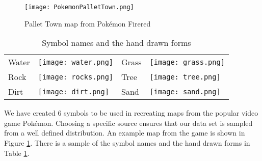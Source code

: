 \begin{figure}[h]
\begin{center}
\texttt{[image: PokemonPalletTown.png]}
\end{center}
\caption{Pallet Town map from Pok\'{e}mon Firered \cite{firered}} 
\label{fig:pokemon}
\end{figure}

\begin{table}
\label{table:symbols}
\caption{Symbol names and the hand drawn forms}
\begin{center}
\begin{tabular}{llll}
Water & \texttt{[image: water.png]} &
Grass & \texttt{[image: grass.png]} \\
Rock & \texttt{[image: rocks.png]} &
Tree & \texttt{[image: tree.png]} \\
Dirt & \texttt{[image: dirt.png]} &
Sand & \texttt{[image: sand.png]} \\
\end{tabular}
\end{center}
\end{table}

We have created 6 symbols to be used in recreating maps from the popular video game
Pok\'{e}mon. Choosing a specific source ensures that our data set is sampled from a well defined distribution.
An example map from the game is shown in Figure \ref{fig:pokemon}. There is a sample
of the symbol names and the hand drawn forms in Table \ref{table:symbols}.


